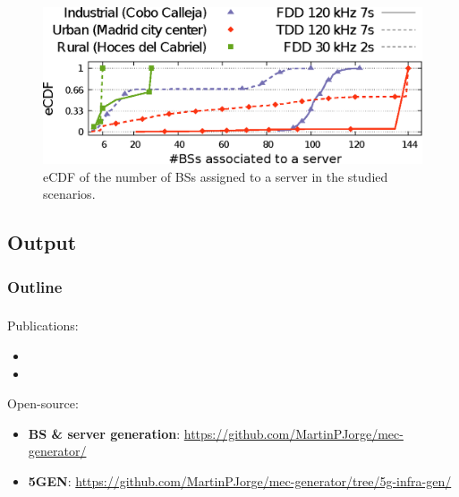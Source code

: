 \documentclass[aspectratio=169]{beamer}
\begin{document}
\begin{frame}

    \frametitle{\secname}
    \framesubtitle{\subsecname}

    \begin{figure}[t]
        \centering
        \includegraphics[width=.8\columnwidth]{img/cdfs}
        \vspace{1em}
        \caption{eCDF of the number of BSs assigned to a server in the studied scenarios.}
        \label{fig:cdfs}
    \end{figure}
\end{frame}


\subsection{Output}
\begin{frame}
    \frametitle{Outline}
    \tableofcontents[subsectionstyle=show/shaded/hide,sectionstyle=show/shaded]
\end{frame}

\begin{frame}
    \frametitle{\secname}
    \framesubtitle{\subsecname}
    Publications:
    \begin{itemize}
        \item {}
        \item {}
    \end{itemize}
    Open-source:
    \begin{itemize}
        \item \textbf{BS \& server generation}: \url{https://github.com/MartinPJorge/mec-generator/}
        \item \textbf{5GEN}: \url{https://github.com/MartinPJorge/mec-generator/tree/5g-infra-gen/}
    \end{itemize}
    

\end{frame}
\end{document}
